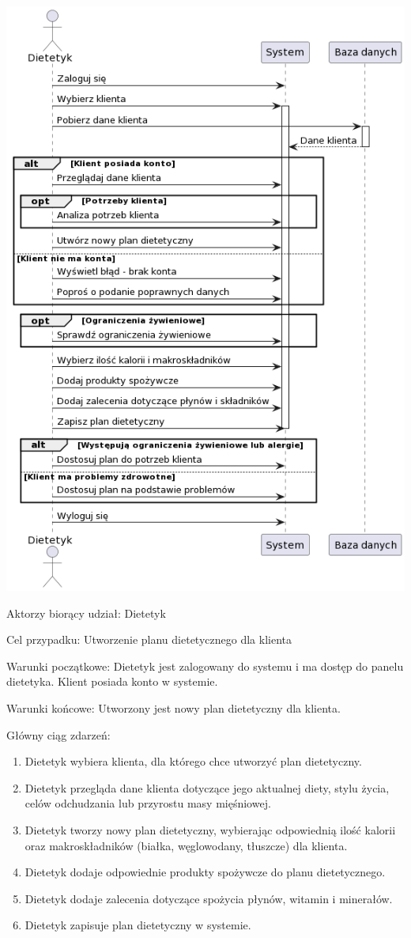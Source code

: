 \documentclass[
]{article}
\providecommand{\tightlist}{%
  \setlength{\itemsep}{0pt}\setlength{\parskip}{0pt}}
\begin{document}
{\includegraphics{diagrams/sequence/dietetyk_stworz_plan.png}}

{Aktorzy biorący udział: Dietetyk}

{Cel przypadku: Utworzenie planu dietetycznego dla klienta}

{Warunki początkowe: Dietetyk jest zalogowany do systemu i ma dostęp do
panelu dietetyka. Klient posiada konto w systemie.}

{Warunki końcowe: Utworzony jest nowy plan dietetyczny dla klienta.}

{Główny ciąg zdarzeń:}

\begin{enumerate}
\tightlist
\item
  {Dietetyk wybiera klienta, dla którego chce utworzyć plan
  dietetyczny.}
\item
  {Dietetyk przegląda dane klienta dotyczące jego aktualnej diety, stylu
  życia, celów odchudzania lub przyrostu masy mięśniowej.}
\item
  {Dietetyk tworzy nowy plan dietetyczny, wybierając odpowiednią ilość
  kalorii oraz makroskładników (białka, węglowodany, tłuszcze) dla
  klienta.}
\item
  {Dietetyk dodaje odpowiednie produkty spożywcze do planu
  dietetycznego.}
\item
  {Dietetyk dodaje zalecenia dotyczące spożycia płynów, witamin i
  minerałów.}
\item
  {Dietetyk zapisuje plan dietetyczny w systemie.}
\end{enumerate}
\end{document}
